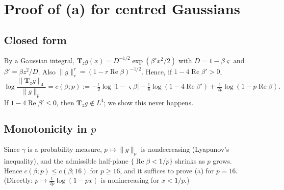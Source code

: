 \documentclass[11pt]{amsart}
\theoremstyle{definition}
\newcommand{\Rea}{\operatorname{Re}}
\newcommand{\bT}{\mathbf{T}}
\begin{document}
\section{Proof of (a) for centred Gaussians}
\subsection{Closed form}
By a Gaussian integral, $\bT_zg(x)=D^{-1/2}\exp(\beta'x^2/2)$ with $D=1-\beta\varsigma$ and
$\beta'=\beta z^2/D$. Also $\|g\|_r^r=(1-r\Rea\beta)^{-1/2}$. Hence, if $1-4\Rea\beta'>0$,
\[
\log\frac{\|\bT_zg\|_4}{\|g\|_p}=c(\beta;p):=-\tfrac12\log|1-\varsigma\beta|-\tfrac18\log(1-4\Rea\beta')
+\tfrac1{2p}\log(1-p\Rea\beta).
\]
If $1-4\Rea\beta'\le0$, then $\bT_zg\notin L^4$; we show this never happens.

\subsection{Monotonicity in $p$}
Since $\gamma$ is a probability measure, $p\mapsto\|g\|_p$ is nondecreasing (Lyapunov's inequality), and the
admissible half-plane $\{\Rea\beta<1/p\}$ shrinks as $p$ grows. Hence $c(\beta;p)\le c(\beta;16)$ for $p\ge16$, and it
suffices to prove (a) for $p=16$. (Directly: $p\mapsto\frac1{2p}\log(1-px)$ is nonincreasing for $x<1/p$.)
\end{document}
